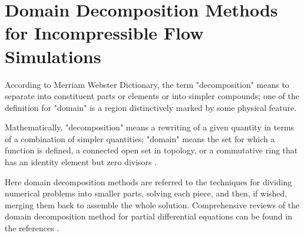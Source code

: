 \section{Domain Decomposition Methods for Incompressible Flow Simulations}

According to Merriam Webster Dictionary, the term "decomposition" means to separate into constituent parts or elements or into simpler compounds; one of the definition for "domain" is a region distinctively marked by some physical feature.

Mathematically, "decomposition" means a rewriting of a given quantity in terms of a combination of simpler quantities; "domain" means the set for which a function is defined, a connected open set in topology, or a commutative ring that has an identity element but zero divisors \cite{Weisstein}.


Here domain decomposition methods are referred to the techniques for dividing numerical problems into smaller parts, solving each piece, and then, if wished, merging them back to assemble the whole solution. Comprehensive reviews of the domain decomposition method for partial differential equations can be found in the references \cite{Toselli05, Quarteroni1999}.



%

